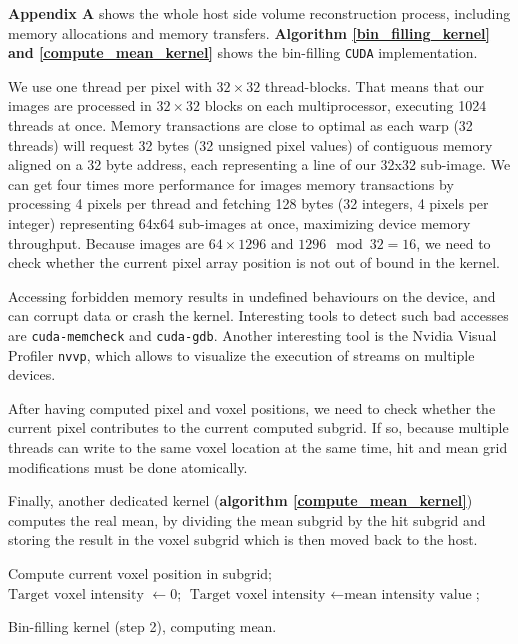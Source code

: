 \documentclass[12pt,journal,compsoc]{IEEEtran}
\begin{document}
\newpage
\textbf{Appendix A} shows the whole host side volume reconstruction process, including memory allocations and memory transfers. 
\textbf{Algorithm \ref{bin_filling_kernel} and \ref{compute_mean_kernel}} shows the bin-filling \texttt{CUDA} implementation.

We use one thread per pixel with $32\times 32$ thread-blocks.
That means that our images are processed in $32\times 32$ blocks on each multiprocessor, executing 1024 threads at once.
Memory transactions are close to optimal as each warp (32 threads) will request 32 bytes (32 unsigned pixel values) of contiguous memory aligned on a 32 byte address, each representing a line of our 32x32 sub-image.
We can get four times more performance for images memory transactions by processing 4 pixels per thread and fetching 128 bytes (32 integers, 4 pixels per integer) representing 64x64 sub-images at once, maximizing device memory throughput.
Because images are $64\times 1296$ and $1296 \mod{32} = 16$, we need to check whether the current pixel array position is not out of bound in the kernel.


Accessing forbidden memory results in undefined behaviours on the device, and can corrupt data or crash the kernel.
Interesting tools to detect such bad accesses are \texttt{cuda-memcheck} and \texttt{cuda-gdb}.
Another interesting tool is the Nvidia Visual Profiler \texttt{nvvp}, which allows to visualize the execution of streams on multiple devices.\par
After having computed pixel and voxel positions, we need to check whether the current pixel contributes to the current computed subgrid. 
If so, because multiple threads can write to the same voxel location at the same time, hit and mean grid modifications must be done atomically.\par
Finally, another dedicated kernel (\textbf{algorithm \ref{compute_mean_kernel}}) computes the real mean, by dividing the mean subgrid by the hit subgrid and storing the result in the voxel subgrid which is then moved back to the host.


\begin{algorithm}
\vspace{0.2cm}
Compute current voxel position in subgrid;\\
%
{$\text{Target voxel intensity }\gets 0$;}%
{$\text{Target voxel intensity }\gets \text{mean intensity value}$;}

\caption{Bin-filling kernel (step 2), computing mean.}
\label{compute_mean_kernel}
\end{algorithm}
\end{document}
